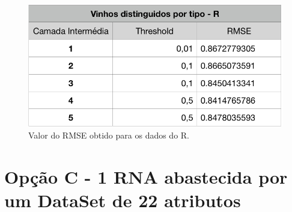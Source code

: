 \documentclass{report}
\begin{document}
\begin{figure}[h!]
\centering
\includegraphics[scale=0.5]{tabelas/6} 
\caption{Valor do RMSE obtido para os dados do R.}
\end{figure} 








































\section{Opção C - 1 RNA abastecida por um DataSet de 22 atributos}
\end{document}
